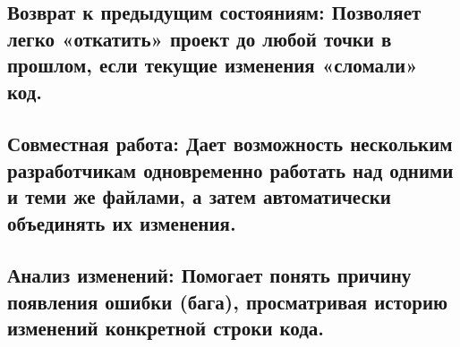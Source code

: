 \documentclass[
  english,
  russian,
  12pt,
  a4paper,
  DIV=11,
  numbers=noendperiod]{scrreprt}
\begin{document}
\subsection{Возврат к предыдущим состояниям: Позволяет легко «откатить»
проект до любой точки в прошлом, если текущие изменения «сломали»
код.}\label{ux432ux43eux437ux432ux440ux430ux442-ux43a-ux43fux440ux435ux434ux44bux434ux443ux449ux438ux43c-ux441ux43eux441ux442ux43eux44fux43dux438ux44fux43c-ux43fux43eux437ux432ux43eux43bux44fux435ux442-ux43bux435ux433ux43aux43e-ux43eux442ux43aux430ux442ux438ux442ux44c-ux43fux440ux43eux435ux43aux442-ux434ux43e-ux43bux44eux431ux43eux439-ux442ux43eux447ux43aux438-ux432-ux43fux440ux43eux448ux43bux43eux43c-ux435ux441ux43bux438-ux442ux435ux43aux443ux449ux438ux435-ux438ux437ux43cux435ux43dux435ux43dux438ux44f-ux441ux43bux43eux43cux430ux43bux438-ux43aux43eux434.}

\subsection{Совместная работа: Дает возможность нескольким разработчикам
одновременно работать над одними и теми же файлами, а затем
автоматически объединять их
изменения.}\label{ux441ux43eux432ux43cux435ux441ux442ux43dux430ux44f-ux440ux430ux431ux43eux442ux430-ux434ux430ux435ux442-ux432ux43eux437ux43cux43eux436ux43dux43eux441ux442ux44c-ux43dux435ux441ux43aux43eux43bux44cux43aux438ux43c-ux440ux430ux437ux440ux430ux431ux43eux442ux447ux438ux43aux430ux43c-ux43eux434ux43dux43eux432ux440ux435ux43cux435ux43dux43dux43e-ux440ux430ux431ux43eux442ux430ux442ux44c-ux43dux430ux434-ux43eux434ux43dux438ux43cux438-ux438-ux442ux435ux43cux438-ux436ux435-ux444ux430ux439ux43bux430ux43cux438-ux430-ux437ux430ux442ux435ux43c-ux430ux432ux442ux43eux43cux430ux442ux438ux447ux435ux441ux43aux438-ux43eux431ux44aux435ux434ux438ux43dux44fux442ux44c-ux438ux445-ux438ux437ux43cux435ux43dux435ux43dux438ux44f.}

\subsection{Анализ изменений: Помогает понять причину появления ошибки
(бага), просматривая историю изменений конкретной строки
кода.}\label{ux430ux43dux430ux43bux438ux437-ux438ux437ux43cux435ux43dux435ux43dux438ux439-ux43fux43eux43cux43eux433ux430ux435ux442-ux43fux43eux43dux44fux442ux44c-ux43fux440ux438ux447ux438ux43dux443-ux43fux43eux44fux432ux43bux435ux43dux438ux44f-ux43eux448ux438ux431ux43aux438-ux431ux430ux433ux430-ux43fux440ux43eux441ux43cux430ux442ux440ux438ux432ux430ux44f-ux438ux441ux442ux43eux440ux438ux44e-ux438ux437ux43cux435ux43dux435ux43dux438ux439-ux43aux43eux43dux43aux440ux435ux442ux43dux43eux439-ux441ux442ux440ux43eux43aux438-ux43aux43eux434ux430.}
\end{document}
